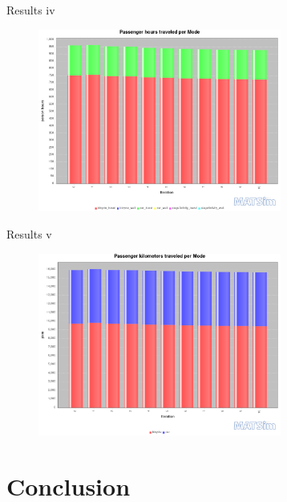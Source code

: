 \documentclass[10pt, aspectratio=169]{beamer}
\begin{document}
\begin{frame}{Results iv}
    \begin{center}
        \begin{figure}
            \centering
            \includegraphics[height=6cm, keepaspectratio]{images/build_city/results/ph_modestats.png}
        \end{figure}
    \end{center}
\end{frame}

\begin{frame}{Results v}
    \begin{center}
        \begin{figure}
            \centering
            \includegraphics[height=6cm, keepaspectratio]{images/build_city/results/pkm_modestats.png}
        \end{figure}
    \end{center}
\end{frame}

\section{Conclusion}
\end{document}
